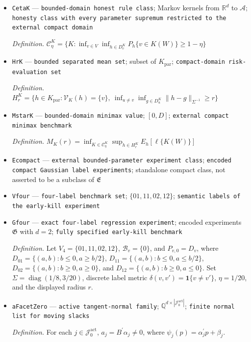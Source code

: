 \documentclass{article}
\begin{document}
\begin{itemize}
  \item \texttt{CetaK} --- \texttt{bounded-\allowbreak{}domain honest rule class}; Markov kernels from \(\mathbb R^d\) to \(\mathcal A\); \texttt{honesty class with every parameter supremum restricted to the external compact domain}
  \par\smallskip\noindent\emph{Definition.} \(\mathcal C_{\eta}^K=\{K:\inf_{v\in V}\inf_{h\in D_v^K}P_h\{v\in K(W)\}\ge1-\eta\}\)
  \item \texttt{HrK} --- \texttt{bounded separated mean set}; subset of \(K_{\mathrm{par}}\); \texttt{compact-\allowbreak{}domain risk-\allowbreak{}evaluation set}
  \par\smallskip\noindent\emph{Definition.} \(H_r^K=\{h\in K_{\mathrm{par}}:\mathcal V_K(h)=\{v\},\ \inf_{u\ne v}\inf_{g\in D_u^K}\|h-g\|_{\Sigma^{-1}}\ge r\}\)
  \item \texttt{MstarK} --- \texttt{bounded-\allowbreak{}domain minimax value}; \([0,D]\); \texttt{external compact minimax benchmark}
  \par\smallskip\noindent\emph{Definition.} \(M_K(r)=\inf_{K\in\mathcal C_{\eta}^K}\sup_{h\in H_r^K}E_h[\ell\{K(W)\}]\)
  \item \texttt{Ecompact} --- \texttt{external bounded-\allowbreak{}parameter experiment class}; \texttt{encoded compact Gaussian label experiments}; standalone compact class, not asserted to be a subclass of \(\mathfrak E\)
  \item \texttt{Vfour} --- \texttt{four-\allowbreak{}label benchmark set}; \(\{01,11,02,12\}\); \texttt{semantic labels of the early-\allowbreak{}kill experiment}
  \item \texttt{Gfour} --- \texttt{exact four-\allowbreak{}label regression experiment}; encoded experiments \(\mathfrak G\) with \(d=2\); \texttt{fully specified early-\allowbreak{}kill benchmark}
  \par\smallskip\noindent\emph{Definition.} Let \(V_4=\{01,11,02,12\}\), \(\mathcal B_v=\{0\}\), and \(P_{v,0}=D_v\), where \(D_{01}=\{(a,b):b\le0,a\ge b/2\}\), \(D_{11}=\{(a,b):b\le0,a\le b/2\}\), \(D_{02}=\{(a,b):b\ge0,a\ge0\}\), and \(D_{12}=\{(a,b):b\ge0,a\le0\}\). Set \(\Sigma=\operatorname{diag}(1/8,3/20)\), discrete label metric \(\delta(v,v')=\mathbf1\{v\ne v'\}\), \(\eta=1/20\), and the displayed radius \(r\).
  \item \texttt{aFacetZero} --- \texttt{active tangent-\allowbreak{}normal family}; \(\mathbb Q^{d\times|\mathcal J_0^{\mathrm{act}}|}\); \texttt{finite normal list for moving slacks}
  \par\smallskip\noindent\emph{Definition.} For each \(j\in\mathcal J_0^{\mathrm{act}}\), \(a_j=B^{\prime}\alpha_j\ne0\), where \(\psi_j(p)=\alpha_j^{\prime}p+\beta_j\).

\end{itemize}
\end{document}
